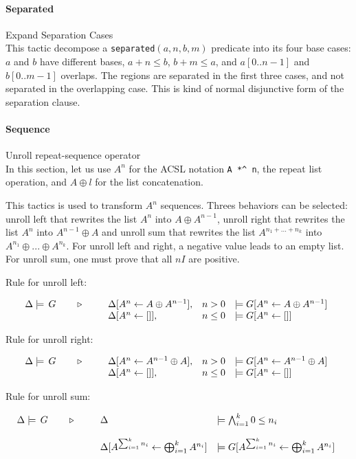 \paragraph{Separated} Expand Separation Cases\\
This tactic decompose a \texttt{separated}$(a,n,b,m)$ predicate into its four base cases: $a$ and $b$ have different bases, $a+n \leq b$, $b+m \leq a$, and $a[0..n-1]$ and $b[0..m-1]$ overlaps. The regions are separated in the first three cases, and not separated in the overlapping case. This is kind of normal disjunctive form of the separation clause.


\paragraph{Sequence} Unroll repeat-sequence operator\\
In this section, let us use $A^n$ for the ACSL notation \lstinline{A *^ n},
the repeat list operation, and $A \oplus l$ for the list concatenation.

This tactics is used to transform $A^n$ sequences. Threes behaviors
can be selected:
unroll left that rewrites the list  $A^n$ into $A \oplus A^{n-1}$,
unroll right that rewrites the list $A^n$ into $A^{n-1} \oplus A$
and unroll sum that rewrites the list $A ^{n_1 + ... + n_k}$
into $A^{n_1} \oplus ... \oplus A^{n_k}$. For unroll left and right,
a negative value leads to an empty list. For unroll sum, one must prove that all
$nI$ are positive.

Rule for unroll left:

\[
\TACTIC{\Delta\models\,G}{%
\begin{array}[t]{lll}
  \Delta[A^n\leftarrow A \oplus A^{n-1}],& n > 0 & \models G[A^n\leftarrow A \oplus A^{n-1}]\\
  \Delta[A^n\leftarrow []],& n \leq 0 & \models G[A^n\leftarrow []]
\end{array}
}\]

Rule for unroll right:

\[
\TACTIC{\Delta\models\,G}{%
\begin{array}[t]{lll}
  \Delta[A^n\leftarrow A^{n-1} \oplus A],& n > 0 & \models G[A^n\leftarrow A^{n-1} \oplus A]\\
  \Delta[A^n\leftarrow []],& n \leq 0 & \models G[A^n\leftarrow []]
\end{array}
}\]

Rule for unroll sum:

\[
\TACTIC{\Delta\models\,G}{%
\begin{array}[t]{ll}
  \Delta & \models\bigwedge_{i=1}^{k} 0 \leq n_i\\
  &\\
  \Delta[A^{\sum_{i=1}^{k}n_i}\leftarrow \bigoplus_{i=1}^{k} A^{n_i}] &
  \models G[A^{\sum_{i=1}^{k}n_i}\leftarrow \bigoplus_{i=1}^{k} A^{n_i}]
\end{array}
}\]

